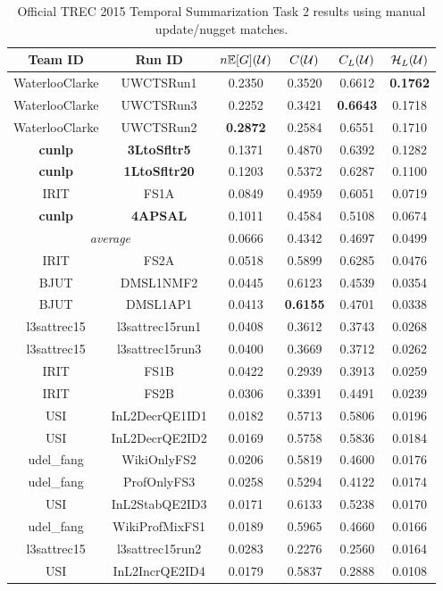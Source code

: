 \begin{table}[p]
\centering
\begin{tabular}{cccccc}
\toprule
Team ID & Run ID &$n\mathbb{E}[G](\mathcal{U})$ & $C(\mathcal{U})$ & $C_L(\mathcal{U})$ & $\mathcal{H}_L(\mathcal{U})$ \\
\midrule
WaterlooClarke & UWCTSRun1 & 0.2350 & 0.3520 & 0.6612 & \textbf{0.1762}\\
WaterlooClarke & UWCTSRun3 & 0.2252 & 0.3421 & \textbf{0.6643} & 0.1718\\
WaterlooClarke & UWCTSRun2 & \textbf{0.2872} & 0.2584 & 0.6551 & 0.1710\\
\textbf{cunlp} & \textbf{3LtoSfltr5} & 0.1371 & 0.4870 & 0.6392 & 0.1282\\
\textbf{cunlp} & \textbf{1LtoSfltr20} & 0.1203 & 0.5372 & 0.6287 & 0.1100\\
IRIT & FS1A & 0.0849 & 0.4959 & 0.6051 & 0.0719\\
\textbf{cunlp} & \textbf{4APSAL} & 0.1011 & 0.4584 & 0.5108 & 0.0674\\
\midrule
\multicolumn{2}{c}{\textit{average}} & 0.0666 & 0.4342 & 0.4697 & 0.0499\\
\midrule
IRIT & FS2A & 0.0518 & 0.5899 & 0.6285 & 0.0476\\
BJUT & DMSL1NMF2 & 0.0445 & 0.6123 & 0.4539 & 0.0354\\
BJUT & DMSL1AP1 & 0.0413 & \textbf{0.6155} & 0.4701 & 0.0338\\
l3sattrec15 & l3sattrec15run1 & 0.0408 & 0.3612 & 0.3743 & 0.0268\\
l3sattrec15 & l3sattrec15run3 & 0.0400 & 0.3669 & 0.3712 & 0.0262\\
IRIT & FS1B & 0.0422 & 0.2939 & 0.3913 & 0.0259\\
IRIT & FS2B & 0.0306 & 0.3391 & 0.4491 & 0.0239\\
USI & InL2DecrQE1ID1 & 0.0182 & 0.5713 & 0.5806 & 0.0196\\
USI & InL2DecrQE2ID2 & 0.0169 & 0.5758 & 0.5836 & 0.0184\\
udel\_fang & WikiOnlyFS2 & 0.0206 & 0.5819 & 0.4600 & 0.0176\\
udel\_fang & ProfOnlyFS3 & 0.0258 & 0.5294 & 0.4122 & 0.0174\\
USI & InL2StabQE2ID3 & 0.0171 & 0.6133 & 0.5238 & 0.0170\\
udel\_fang & WikiProfMixFS1 & 0.0189 & 0.5965 & 0.4660 & 0.0166\\
l3sattrec15 & l3sattrec15run2 & 0.0283 & 0.2276 & 0.2560 & 0.0164\\
USI & InL2IncrQE2ID4 & 0.0179 & 0.5837 & 0.2888 & 0.0108\\
\bottomrule
\end{tabular}
\caption{Official TREC 2015 Temporal Summarization Task 2 results
using manual update/nugget matches.}
\label{tab:trec15t2}
\end{table}
